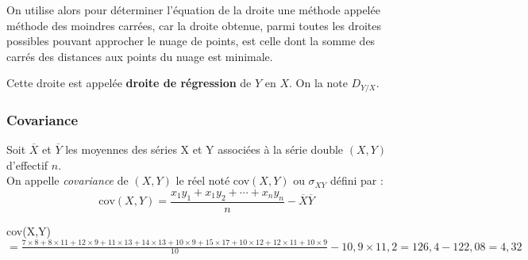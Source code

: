  On utilise alors pour déterminer l'équation de la droite  une méthode appelée méthode des moindres carrées, car la droite obtenue, parmi toutes les droites possibles pouvant approcher le nuage de points, est celle dont la somme des carrés des distances aux points du nuage est minimale.

 Cette droite est appelée  \textbf{droite de régression}
 de $Y$ en $X$. On la note $D _{Y/X }$.
 
 
 \begin{center}
\end{center}
 \subsubsection*{Covariance}
\begin{definition}

Soit $ \overline{X} $ et $ \overline{Y} $ les moyennes des séries
 X et Y associées à la série double $(X,Y)$
d'effectif $n$. \\On appelle \textit{covariance } de $(X,Y)$ le
réel noté cov$(X,Y)$ ou   $ \sigma _{XY} $ défini par : 
\[\text{cov}(X,Y)=\dfrac{x_{1}y_{1}+x_{1}y_{2}+\cdots+x_{n}y_{n}}{ n}  -\overline{X}\overline{Y}\]
\end{definition}
\begin{example}

 cov(X,Y)$= \frac{  7 \times8+ 8\times11+  12 \times9+  11\times13 +  14 \times13 +10 \times9+ 15\times17 + 10\times 12+12\times11 + 10\times9}{10} - 10,9 \times 11,2=126,4-122,08=4,32$

\end{example}

